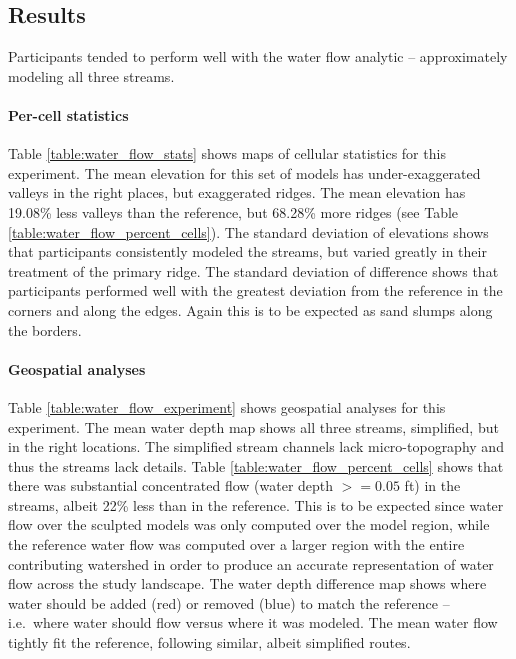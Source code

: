 \documentclass[prodmode,acmtochi]{acmsmall} %
\begin{document}
\subsection{Results}
Participants tended to perform well with the water flow analytic 
-- approximately modeling all three streams.  

\paragraph{Per-cell statistics}
Table \ref{table:water_flow_stats} shows maps of cellular statistics for this experiment.
The mean elevation for this set of models
has under-exaggerated valleys in the right places, but exaggerated ridges. 
The mean elevation has 19.08\% less valleys than the reference, but
68.28\% more ridges (see Table \ref{table:water_flow_percent_cells}). 
The standard deviation of elevations shows that participants 
consistently modeled the streams, but
varied greatly in their treatment of the primary ridge. 
The standard deviation of difference shows that participants 
performed well 
with the greatest deviation from the reference
in the corners and along the edges. 
Again this is to be expected 
as sand slumps along the borders. 

\paragraph{Geospatial analyses}
Table \ref{table:water_flow_experiment} shows geospatial analyses for this experiment.
The mean water depth map shows all three streams, 
simplified, but in the right locations. 
The simplified stream channels lack micro-topography
and thus the streams lack details. 
Table \ref{table:water_flow_percent_cells} shows that 
there was substantial concentrated flow (water depth $>=0.05$ ft) 
in the streams, albeit 22\% less than in the reference.
This is to be expected 
since 
water flow over the sculpted models was only computed over the model region, 
while 
the reference water flow 
was computed over a larger region 
with the entire contributing watershed 
in order to produce an accurate representation 
of water flow across the study landscape. 
The water depth difference map shows
where water should be added (red) or removed (blue) 
to match the reference
-- i.e.~where water should flow versus where it was modeled. 
The mean water flow tightly fit the reference, 
following similar, albeit simplified routes.
\end{document}
